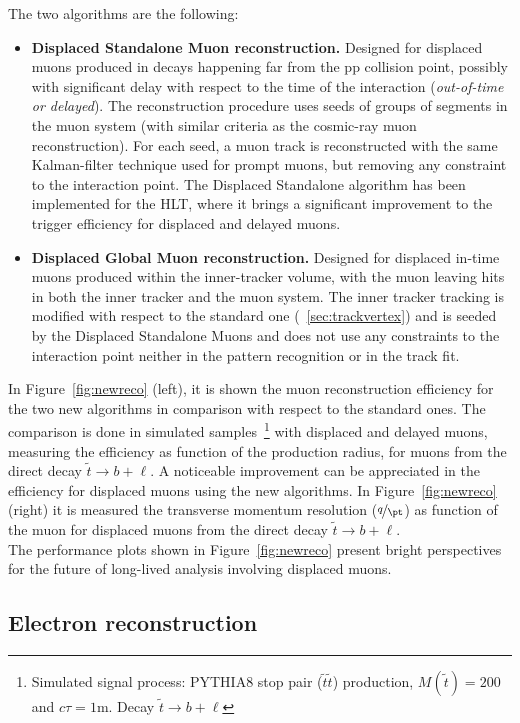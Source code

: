 The two algorithms are the following:
\begin{itemize}
\setlength\itemsep{-0.2em}
\item \textbf{Displaced Standalone Muon reconstruction.} Designed for
  displaced muons produced in decays happening far from the pp
  collision point, possibly with significant delay with respect to the time of the
  interaction (\emph{out-of-time or delayed}). The reconstruction
  procedure uses seeds of groups of segments in the muon system
  (with similar criteria as the cosmic-ray muon reconstruction). For
  each seed, a muon track is reconstructed with the same Kalman-filter
  technique used for prompt muons, but removing any constraint to the
  interaction point. The Displaced Standalone algorithm has been implemented for the HLT,
  where it brings a significant improvement to the trigger efficiency for displaced and delayed
  muons.
\item \textbf{Displaced Global Muon reconstruction.} Designed for displaced in-time muons produced within the inner-tracker volume, with the
  muon leaving hits in both the inner tracker and the muon system. The
  inner tracker tracking is modified with respect to the standard one
  (~\ref{sec:trackvertex}) and is seeded by the Displaced Standalone Muons and does
  not use any constraints to the interaction point neither in the pattern recognition or in the track fit.
\end{itemize}
In Figure~\ref{fig:newreco} (left), it is shown the muon reconstruction
efficiency for the two new algorithms in comparison with respect to
the standard ones. The comparison is done in 
simulated samples~\footnote{Simulated signal process: PYTHIA8 stop 
  pair ($\tilde{t}\tilde{t}$) production, $M(\tilde{t}) = 200$\GeV and
$c\tau=1$m. Decay $\tilde{t} \rightarrow b + \ell$} with displaced and
delayed muons, measuring the efficiency as function of the production radius, for muons from
the direct decay $\tilde{t} \rightarrow b + \ell$. A noticeable
improvement can be appreciated in the efficiency for displaced muons
using the new algorithms. In Figure~\ref{fig:newreco} (right) it is
measured the transverse momentum resolution ($\nicefrac{q}{\pt}$) as
function of the muon \pt for displaced muons from the direct decay $\tilde{t} \rightarrow b + \ell$.\\
The performance plots shown in Figure~\ref{fig:newreco} present bright
perspectives for the future of long-lived analysis involving
displaced muons. 

\subsection{Electron reconstruction}\label{sec:c2ele}

